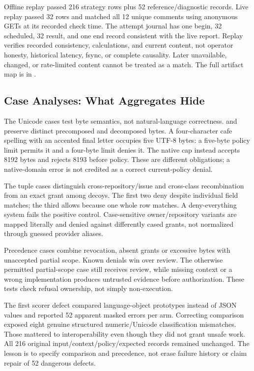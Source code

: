 \documentclass[11pt,letterpaper]{article}
\newcommand{\code}[1]{\texttt{\detokenize{#1}}}
\begin{document}
Offline replay passed 216 strategy rows plus 52 reference/diagnostic records.
Live replay passed 32 rows and matched all 12 unique comments using anonymous
GETs at its recorded check time. The attempt journal has one begin, 32 scheduled,
32 result, and one end record consistent with the live report. Replay verifies
recorded consistency, calculations, and current content, not operator honesty,
historical latency, fsync, or complete causality. Later unavailable, changed, or
rate-limited content cannot be treated as a match. The full artifact map is in
.

\subsection{Case Analyses: What Aggregates Hide}

The Unicode cases test byte semantics, not natural-language correctness.
\code{unicode-nfc} and \code{unicode-nfd} preserve distinct precomposed and
decomposed bytes. A four-character cafe spelling with an accented final letter
occupies five UTF-8 bytes: a five-byte policy limit permits it and a four-byte
limit denies it. The native cap instead accepts 8192 bytes and rejects 8193
before policy. These are different obligations; a native-domain error is not
credited as a correct current-policy denial.

The tuple cases distinguish cross-repository/issue and cross-class recombination
from an exact grant among decoys. The first two deny despite individual field
matches; the third allows because one whole row matches. A deny-everything
system fails the positive control. Case-sensitive owner/repository variants
are mapped literally and denied against differently cased grants, not normalized
through guessed provider aliases.

Precedence cases combine revocation, absent grants or excessive bytes with
unaccepted partial scope. Known denials win over review. The otherwise permitted
partial-scope case still receives review, while missing context or a wrong
implementation produces untrusted evidence before authorization. These tests
check refusal ownership, not simply non-execution.

The first scorer defect compared language-object prototypes instead of JSON
values and reported 52 apparent masked errors per arm. Correcting comparison
exposed eight genuine structured numeric/Unicode classification mismatches.
Those mattered to interoperability even though they did not grant unsafe work.
All 216 original input/context/policy/expected records remained unchanged. The
lesson is to specify comparison and precedence, not erase failure history or
claim repair of 52 dangerous defects.
\end{document}
